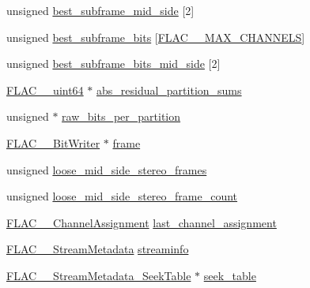 \begin{DoxyCompactItemize}
\item 
unsigned \hyperlink{struct_f_l_a_c_____stream_encoder_private_a35209fa9cccf2b38fcd88c3af299b846}{best\+\_\+subframe\+\_\+mid\+\_\+side} \mbox{[}2\mbox{]}
\item 
unsigned \hyperlink{struct_f_l_a_c_____stream_encoder_private_ae0d127ce11107a98da1ac04a597037da}{best\+\_\+subframe\+\_\+bits} \mbox{[}\hyperlink{group__flac__format_ga488aa5678a58d08f984f5d39185b763d}{F\+L\+A\+C\+\_\+\+\_\+\+M\+A\+X\+\_\+\+C\+H\+A\+N\+N\+E\+LS}\mbox{]}
\item 
unsigned \hyperlink{struct_f_l_a_c_____stream_encoder_private_a485bad41f46981b778caaa081d71bc6c}{best\+\_\+subframe\+\_\+bits\+\_\+mid\+\_\+side} \mbox{[}2\mbox{]}
\item 
\hyperlink{ordinals_8h_aa78c8c70a3eb8a58af7436f278acde8e}{F\+L\+A\+C\+\_\+\+\_\+uint64} $\ast$ \hyperlink{struct_f_l_a_c_____stream_encoder_private_aa63dec17dc75910b274ab8467768f8c6}{abs\+\_\+residual\+\_\+partition\+\_\+sums}
\item 
unsigned $\ast$ \hyperlink{struct_f_l_a_c_____stream_encoder_private_a2b2003d87906af4e0b1fed845a61f383}{raw\+\_\+bits\+\_\+per\+\_\+partition}
\item 
\hyperlink{struct_f_l_a_c_____bit_writer}{F\+L\+A\+C\+\_\+\+\_\+\+Bit\+Writer} $\ast$ \hyperlink{struct_f_l_a_c_____stream_encoder_private_ab8f4c8c356e31155160278b391e7e35b}{frame}
\item 
unsigned \hyperlink{struct_f_l_a_c_____stream_encoder_private_ae9d32f8bb10b1eb493884bea9dab18e2}{loose\+\_\+mid\+\_\+side\+\_\+stereo\+\_\+frames}
\item 
unsigned \hyperlink{struct_f_l_a_c_____stream_encoder_private_aec419c9945de82a8d648cbc8a8dac312}{loose\+\_\+mid\+\_\+side\+\_\+stereo\+\_\+frame\+\_\+count}
\item 
\hyperlink{group__flac__format_ga79855f8525672e37f299bbe02952ef9c}{F\+L\+A\+C\+\_\+\+\_\+\+Channel\+Assignment} \hyperlink{struct_f_l_a_c_____stream_encoder_private_ac1d1aa817c3b1f5e7975a61dcb69f392}{last\+\_\+channel\+\_\+assignment}
\item 
\hyperlink{struct_f_l_a_c_____stream_metadata}{F\+L\+A\+C\+\_\+\+\_\+\+Stream\+Metadata} \hyperlink{struct_f_l_a_c_____stream_encoder_private_a6b0918ef2676ddcff173ebbb71237080}{streaminfo}
\item 
\hyperlink{struct_f_l_a_c_____stream_metadata___seek_table}{F\+L\+A\+C\+\_\+\+\_\+\+Stream\+Metadata\+\_\+\+Seek\+Table} $\ast$ \hyperlink{struct_f_l_a_c_____stream_encoder_private_a77d24ba3f1e39252c3a3052b4c269f65}{seek\+\_\+table}

\end{DoxyCompactItemize}
